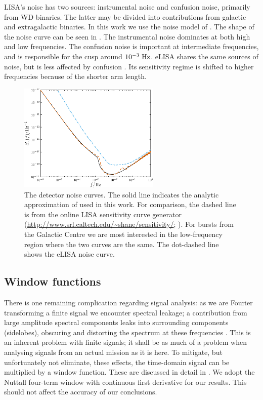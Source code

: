 LISA's noise has two sources: instrumental noise and confusion noise, primarily from WD binaries. The latter may be divided into contributions from galactic and extragalactic binaries. In this work we use the noise model of \citet{Barack2004}. The shape of the noise curve can be seen in . The instrumental noise dominates at both high and low frequencies. The confusion noise is important at intermediate frequencies, and is responsible for the cusp around $10^{-3}~\mathrm{Hz}$. eLISA shares the same sources of noise, but is less affected by confusion \citep{Jennrich2011}. Its sensitivity regime is shifted to higher frequencies because of the shorter arm length.
\begin{figure}[!htp]
\begin{center}
\includegraphics[width=0.6\textwidth]{./images/Fig_Noise}
\caption{The detector noise curves. The solid line indicates the analytic approximation of \citet{Barack2004} used in this work. For comparison, the dashed line is from the online LISA sensitivity curve generator (\url{http://www.srl.caltech.edu/~shane/sensitivity/}; \citealt*{Larson2000, Larson2002}). For bursts from the Galactic Centre we are most interested in the low-frequency region where the two curves are the same. The dot-dashed line shows the eLISA noise curve.\label{fig:Noise}}
\end{center}
\end{figure}

\subsection{Window functions}

There is one remaining complication regarding signal analysis: as we are Fourier transforming a finite signal we encounter spectral leakage; a contribution from large amplitude spectral components leaks into surrounding components (sidelobes), obscuring and distorting the spectrum at these frequencies \citep{Harris1978}. This is an inherent problem with finite signals; it shall be as much of a problem when analysing signals from an actual mission as it is here. To mitigate, but unfortunately not eliminate, these effects, the time-domain signal can be multiplied by a window function. These are discussed in detail in . We adopt the Nuttall four-term window with continuous first derivative \citep{Nuttall1981} for our results. This should not affect the accuracy of our conclusions.

